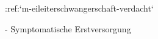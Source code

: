 :ref:`m-eileiterschwangerschaft-verdacht`
\begin{itemize}
    -   Symptomatische Erstversorgung
\end{itemize}